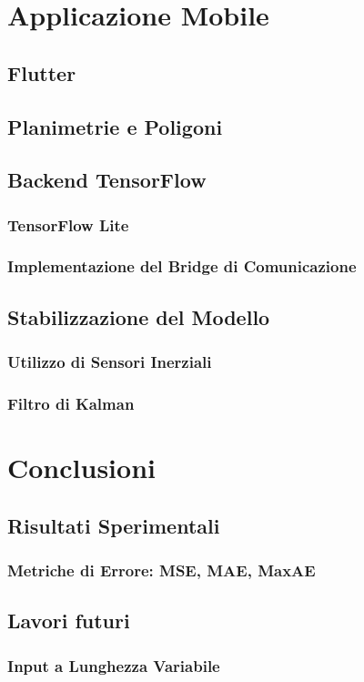 \documentclass[12pt]{report}
\begin{document}
\chapter{Applicazione Mobile}
\section{Flutter}
\section{Planimetrie e Poligoni}
\section{Backend TensorFlow}
\subsection{TensorFlow Lite}
\subsection{Implementazione del Bridge di Comunicazione}
\section{Stabilizzazione del Modello}
\subsection{Utilizzo di Sensori Inerziali}
\subsection{Filtro di Kalman}

\chapter{Conclusioni}
\section{Risultati Sperimentali}
\subsection{Metriche di Errore: MSE, MAE, MaxAE}

\section{Lavori futuri}
\subsection{Input a Lunghezza Variabile}
\end{document}
